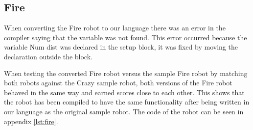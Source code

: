 \subsection{Fire}
When converting the Fire robot to our language there was an error in the compiler saying that the variable was not found. This error occurred because the variable Num dist was declared in the setup block, it was fixed by moving the declaration outside the block.

When testing the converted Fire robot versus the sample Fire robot by matching both robots against the Crazy sample robot, both versions of the Fire robot behaved in the same way and earned scores close to each other.
This shows that the robot has been compiled to have the same functionality after being written in our language as the original sample robot.
The code of the robot can be seen in appendix \ref{lst:fire}.
